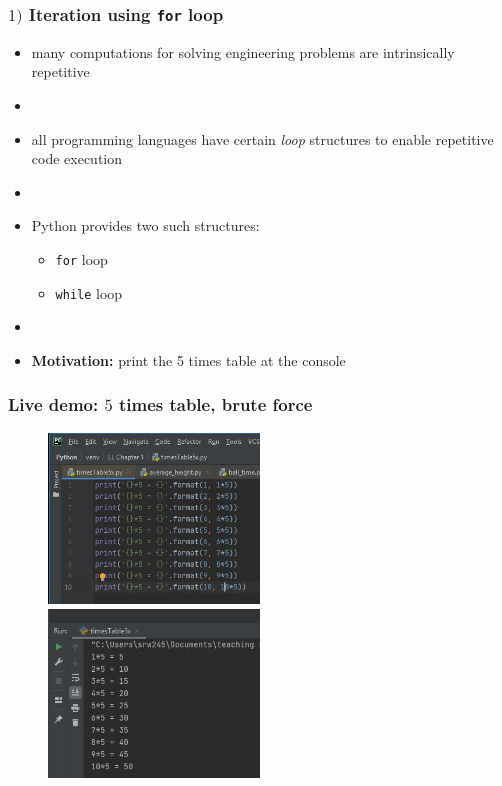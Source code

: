 \documentclass[english,14pt]{beamer}
\newcommand\red[1]{{\color{red} #1}}
\begin{document}
\begin{frame}[fragile]

\frametitle{$1)$ Iteration using \texttt{for} loop}

\begin{itemize}
	\item many computations for solving engineering problems are intrinsically repetitive
	\item[]
	\item all programming languages have certain \red{\emph{loop}} structures to enable repetitive code execution
	\item[]
	\item Python provides two such structures:
	\begin{itemize}
		\item \texttt{for} loop
		\item \texttt{while} loop
	\end{itemize}
	\item[]
	\vspace*{-3mm}
	\item \textbf{Motivation:} print the 5 times table at the console
\end{itemize}

\end{frame}

\begin{frame}[fragile]

\frametitle{}

\frametitle{Live demo: $5$ times table, brute force} %

\begin{figure}[ht]
	\centering
	\includegraphics[width=0.5\textwidth]{figures/LLp59aoutput}%
	~~\includegraphics[width=0.5\textwidth]{figures/LLp59boutput}
\end{figure}


\end{frame}
\end{document}
